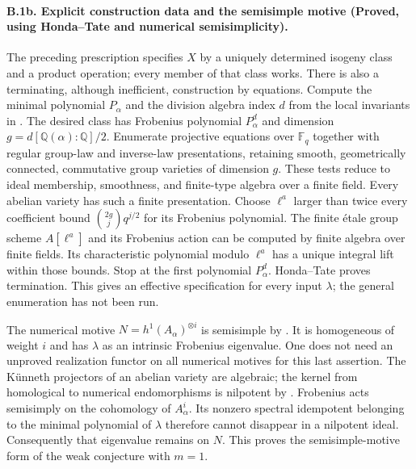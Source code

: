 \paragraph{B.1b. Explicit construction data and the semisimple motive
(Proved, using Honda--Tate and numerical semisimplicity).}
\label{B1b}
The preceding prescription specifies $X$ by a uniquely determined
isogeny class and a product operation; every member of that class works.
There is also a terminating, although inefficient, construction by
equations. Compute the minimal polynomial $P_\alpha$ and the division
algebra index $d$ from the local invariants in
\citet[Th\'eor\`eme~1(ii)]{Tate1971}. The desired class has
Frobenius polynomial $P_\alpha^d$ and dimension
$g=d[\mathbb Q(\alpha):\mathbb Q]/2$. Enumerate projective equations
over $\mathbb F_q$ together with regular group-law and inverse-law
presentations, retaining smooth, geometrically connected, commutative
group varieties of dimension $g$. These tests reduce to ideal
membership, smoothness, and finite-type algebra over a finite field.
Every abelian variety has such a finite presentation. Choose
$\ell^a$ larger than twice every coefficient bound
$\binom{2g}{j}q^{j/2}$ for its Frobenius polynomial. The finite
\'etale group scheme $A[\ell^a]$ and its Frobenius action can be
computed by finite algebra over finite fields. Its characteristic
polynomial modulo $\ell^a$ has a unique integral lift within those
bounds. Stop at the first polynomial $P_\alpha^d$.
Honda--Tate proves termination. This gives an effective specification
for every input $\lambda$; the general enumeration has not been run.

The numerical motive $N=h^1(A_\alpha)^{\otimes i}$ is semisimple by
\citet[Theorem~1]{Jannsen1992}. It is homogeneous of weight $i$ and has
$\lambda$ as an intrinsic Frobenius eigenvalue. One does not need an
unproved realization functor on all numerical motives for this last
assertion. The K\"unneth projectors of an abelian variety are algebraic;
the kernel from homological to numerical endomorphisms is nilpotent by
\citet[Corollary~1]{Jannsen1992}. Frobenius acts semisimply on the
cohomology of $A_\alpha^i$. Its nonzero spectral idempotent belonging to
the minimal polynomial of $\lambda$ therefore cannot disappear in a
nilpotent ideal. Consequently that eigenvalue remains on $N$. This
proves the semisimple-motive form of the weak conjecture with $m=1$.

